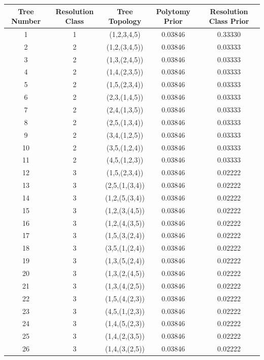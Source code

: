 \documentclass[10pt]{article}
\begin{document}
\begin{tabular}{ccccc}
Tree Number & Resolution Class & Tree Topology & Polytomy Prior & Resolution Class Prior \\ \hline
1	 &   1	  	&  (1,2,3,4,5)	  	&    0.03846	&    0.33330 \\
2	 & 	 2		&  (1,2,(3,4,5))	& 	 0.03846	& 	 0.03333 \\
3	 & 	 2		&  (1,3,(2,4,5))	& 	 0.03846	& 	 0.03333 \\
4	 & 	 2		&  (1,4,(2,3,5))	& 	 0.03846	& 	 0.03333 \\
5	 & 	 2		&  (1,5,(2,3,4))	& 	 0.03846	& 	 0.03333 \\
6	 & 	 2		&  (2,3,(1,4,5))	& 	 0.03846	& 	 0.03333 \\
7	 & 	 2		&  (2,4,(1,3,5))	& 	 0.03846	& 	 0.03333 \\
8	 & 	 2		&  (2,5,(1,3,4))	& 	 0.03846	& 	 0.03333 \\
9	 & 	 2		&  (3,4,(1,2,5))	& 	 0.03846	& 	 0.03333 \\
10	 & 	 2		&  (3,5,(1,2,4))	& 	 0.03846	& 	 0.03333 \\
11	 & 	 2	  	&  (4,5,(1,2,3))	& 	 0.03846	&    0.03333 \\
12	 & 	 3		&  (1,5,(2,3,4))	& 	 0.03846	& 	 0.02222 \\
13   &   3		&  (2,5,(1,(3,4))	& 	 0.03846	& 	 0.02222 \\
14	 & 	 3		&  (1,2,(5,(3,4))	& 	 0.03846	& 	 0.02222 \\
15	 & 	 3		&  (1,2,(3,(4,5))	& 	 0.03846	& 	 0.02222 \\
16	 & 	 3		&  (1,2,(4,(3,5))	& 	 0.03846	& 	 0.02222 \\
17	 & 	 3		&  (1,5,(3,(2,4))	& 	 0.03846	& 	 0.02222 \\
18	 & 	 3		&  (3,5,(1,(2,4))	& 	 0.03846	& 	 0.02222 \\
19	 & 	 3		&  (1,3,(5,(2,4))	& 	 0.03846	& 	 0.02222 \\
20	 & 	 3		&  (1,3,(2,(4,5))	& 	 0.03846	& 	 0.02222 \\
21	 & 	 3		&  (1,3,(4,(2,5))	& 	 0.03846	& 	 0.02222 \\
22	 & 	 3		&  (1,5,(4,(2,3))	& 	 0.03846	& 	 0.02222 \\
23	 & 	 3		&  (4,5,(1,(2,3))	& 	 0.03846	& 	 0.02222 \\
24	 & 	 3		&  (1,4,(5,(2,3))	& 	 0.03846	& 	 0.02222 \\
25	 & 	 3		&  (1,4,(2,(3,5))	& 	 0.03846	& 	 0.02222 \\
26	 & 	 3	  	&  (1,4,(3,(2,5))	& 	 0.03846	&    0.02222 \\ \hline
\end{tabular}
\end{document}

